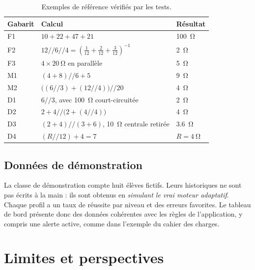 \documentclass[11pt,a4paper]{report}
\newcommand{\para}{\mathbin{/\!/}}
\begin{document}
\begin{table}[ht]
\centering
\caption{Exemples de référence vérifiés par les tests.}\label{tab:ref}
\small
\begin{tabular}{lll}
  \toprule
  Gabarit & Calcul & Résultat \\
  \midrule
  F1 & $10 + 22 + 47 + 21$ & \SI{100}{\ohm} \\
  F2 & $12 \para 6 \para 4 = \left(\frac1{12} + \frac2{12} + \frac3{12}\right)^{-1}$ & \SI{2}{\ohm} \\
  F3 & $4 \times \SI{20}{\ohm}$ en parallèle & \SI{5}{\ohm} \\
  M1 & $(4 + 8) \para 6 + 5$ & \SI{9}{\ohm} \\
  M2 & $\big((6 \para 3) + (12 \para 4)\big) \para 20$ & \SI{4}{\ohm} \\
  D1 & $6 \para 3$, avec \SI{100}{\ohm} court-circuitée & \SI{2}{\ohm} \\
  D2 & $2 + 4 \para \big(2 + (4 \para 4)\big)$ & \SI{4}{\ohm} \\
  D3 & $(2 + 4) \para (3 + 6)$, \SI{10}{\ohm} centrale retirée & \SI{3.6}{\ohm} \\
  D4 & $(R \para 12) + 4 = 7$ & $R = \SI{4}{\ohm}$ \\
  \bottomrule
\end{tabular}
\end{table}

\section{Données de démonstration}
La classe de démonstration compte huit élèves fictifs. Leurs historiques ne sont pas écrits à la main : ils sont obtenus en \emph{simulant le vrai moteur adaptatif}. Chaque profil a un taux de réussite par niveau et des erreurs favorites. Le tableau de bord présente donc des données cohérentes avec les règles de l'application, y compris une alerte active, comme dans l'exemple du cahier des charges.

\chapter{Limites et perspectives}\label{ch:persp}
\end{document}
